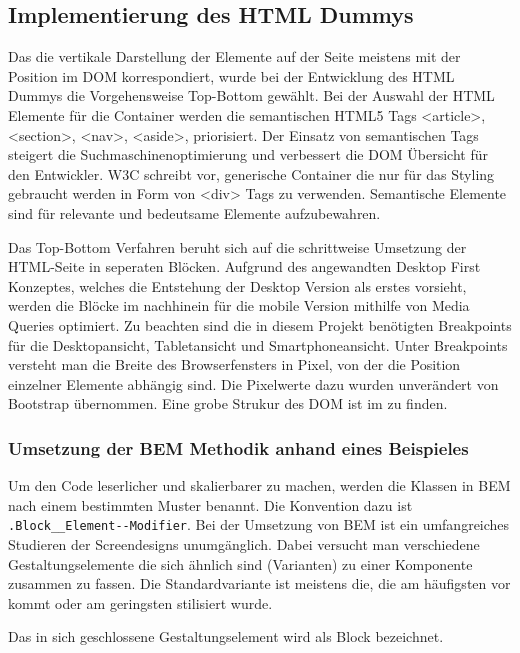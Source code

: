 \subsection{Implementierung des HTML Dummys}
\label{sec:ImplementierungDummy}

Das die vertikale Darstellung der Elemente auf der Seite meistens mit der
Position im \ac{DOM} korrespondiert, wurde bei der Entwicklung des HTML Dummys
die Vorgehensweise Top-Bottom gewählt. Bei der Auswahl der \ac{HTML} Elemente
für die Container werden die semantischen \ac{HTML}5 Tags <article>, <section>,
<nav>, <aside>, \usw priorisiert. Der Einsatz von semantischen Tags steigert
die Suchmaschinenoptimierung und verbessert die \ac{DOM} Übersicht für den
Entwickler. \ac{W3C} schreibt vor, generische Container die nur für das Styling
gebraucht werden in Form von <div> Tags zu verwenden. Semantische Elemente sind
für relevante und bedeutsame Elemente aufzubewahren.


Das Top-Bottom Verfahren beruht sich auf die schrittweise Umsetzung der
\ac{HTML}-Seite in seperaten Blöcken. Aufgrund des angewandten Desktop
First Konzeptes, welches die Entstehung der Desktop Version als erstes vorsieht,
werden die Blöcke im nachhinein für die mobile Version mithilfe von Media
Queries optimiert. Zu beachten sind die in diesem Projekt benötigten Breakpoints für die
Desktopansicht, Tabletansicht und Smartphoneansicht. Unter Breakpoints versteht
man die Breite des Browserfensters in Pixel, von der die Position einzelner
Elemente abhängig sind. Die Pixelwerte dazu wurden unverändert von Bootstrap
übernommen. Eine grobe Strukur des \ac{DOM} ist im  zu
finden. 

\subsubsection{Umsetzung der BEM Methodik anhand eines Beispieles}
\label{sec:BEMExample}
Um den Code leserlicher und skalierbarer zu machen,
werden die Klassen in \acs{BEM} nach einem bestimmten Muster benannt. 
Die Konvention dazu ist \lstinline{.Block__Element--Modifier}. 
Bei der Umsetzung von \ac{BEM} ist ein umfangreiches Studieren der Screendesigns
unumgänglich. Dabei versucht man verschiedene Gestaltungselemente die sich
ähnlich sind (Varianten) zu einer Komponente zusammen zu fassen. 
Die Standardvariante ist meistens die, die am häufigsten vor kommt oder am
geringsten stilisiert wurde. 

Das in sich geschlossene Gestaltungselement wird als Block bezeichnet. 


